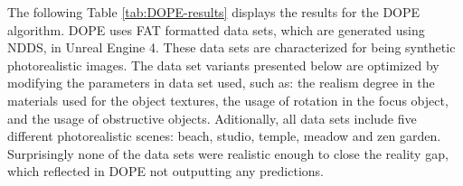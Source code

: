 
The following Table \ref{tab:DOPE-results} displays the results for the DOPE algorithm. DOPE uses FAT formatted data sets, which are generated using NDDS, in Unreal Engine 4. These data sets are characterized for being synthetic photorealistic images. The data set variants presented below are optimized by modifying the parameters in data set used, such as:
the realism degree in the materials used for the object textures, the usage of rotation in the focus object, and the usage of obstructive objects. Aditionally, all data sets include five different photorealistic scenes: beach, studio, temple, meadow and zen garden. Surprisingly none of the data sets were realistic enough to close the reality gap, which reflected in DOPE not outputting any predictions.

